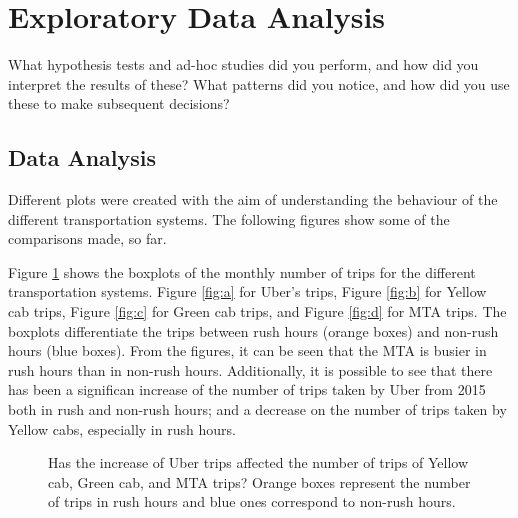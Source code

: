 \section{Exploratory Data Analysis}
\label{sec:datAnalisys}
What hypothesis tests and ad-hoc studies did you perform,
and how did you interpret the results of these? What patterns did you notice, and how
did you use these to make subsequent decisions?




\subsection{Data Analysis}

Different plots were created with the aim of understanding the behaviour of the different transportation systems. The following figures show some of the comparisons made, so far.

Figure \ref{fig:boxTrips} shows the boxplots of the monthly number of trips for the different transportation systems. Figure \ref{fig:a} for Uber's trips, Figure \ref{fig:b} for Yellow cab trips, Figure \ref{fig:c} for Green cab trips, and Figure \ref{fig:d} for MTA trips. The boxplots differentiate the trips between rush hours (orange boxes) and non-rush hours (blue boxes). From the figures, it can be seen that the MTA is busier in rush hours than in non-rush hours. Additionally, it is possible to see that there has been a significan increase of the number of trips taken by Uber from 2015 both in rush and non-rush hours; and a decrease on the number of trips taken by Yellow cabs, especially in rush hours. 

\begin{figure}%
\centering
{}%
\qquad
{}%
\qquad
{}%
\qquad
{}%
\caption{Has the increase of Uber trips affected the number of trips of Yellow cab, Green cab, and MTA trips? Orange boxes represent the number of trips in rush hours and blue ones correspond to non-rush hours. }
\label{fig:boxTrips}%
\end{figure}



